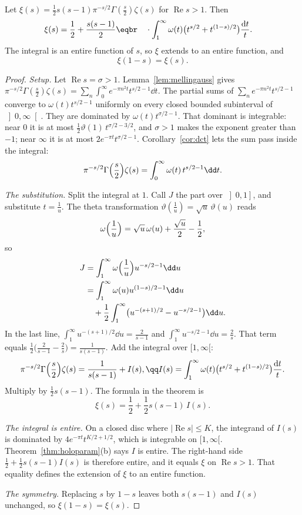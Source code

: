 \begin{theorem}[Riemann, 1859]\label{thm:functional}
Let $\xi(s)=\frac12s(s-1)\pi^{-s/2}\Gamma(\frac s2)\zeta(s)$ for $\operatorname{Re}s>1$. Then
\[
\begin{aligned}\xi(s)&=\frac12+\frac{s(s-1)}2\eqbr\quad\cdot\int_1^\infty\omega(t)\bigl(t^{s/2}+t^{(1-s)/2}\bigr)\frac{\mathrm dt}t.\end{aligned}
\]
The integral is an entire function of $s$, so $\xi$ extends to an entire function, and
\[
\xi(1-s)=\xi(s).
\]
\end{theorem}
\begin{proof}
\textit{Setup.} Let $\operatorname{Re}s=\sigma>1$. Lemma~\ref{lem:mellingauss} gives $\pi^{-s/2}\Gamma(\frac s2)\zeta(s)=\sum_n\int_0^\infty e^{-\pi n^2t}t^{s/2-1}\dd t$. The partial sums of $\sum_ne^{-\pi n^2t}t^{s/2-1}$ converge to $\omega(t)t^{s/2-1}$ uniformly on every closed bounded subinterval of $\left]0,\infty\right[$. They are dominated by $\omega(t)t^{\sigma/2-1}$. That dominant is integrable: near $0$ it is at most $\frac12\vartheta(1)\,t^{\sigma/2-3/2}$, and $\sigma>1$ makes the exponent greater than $-1$; near $\infty$ it is at most $2e^{-\pi t}t^{\sigma/2-1}$. Corollary~\ref{cor:dct} lets the sum pass inside the integral:
\[
\pi^{-s/2}\Gamma\Bigl(\frac s2\Bigr)\zeta(s)=\int_0^\infty\omega(t)\,t^{s/2-1}\dd t.
\]

\textit{The substitution.} Split the integral at $1$. Call $J$ the part over $\left]0,1\right]$, and substitute $t=\frac1u$. The theta transformation $\vartheta(\frac1u)=\sqrt u\,\vartheta(u)$ reads
\[
\omega\Bigl(\frac1u\Bigr)=\sqrt u\,\omega(u)+\frac{\sqrt u}2-\frac12,
\]
so
\[
\begin{aligned}J&=\int_1^\infty\omega\Bigl(\frac1u\Bigr)u^{-s/2-1}\dd u\\&=\int_1^\infty\omega(u)u^{(1-s)/2-1}\dd u\\&\quad+\frac12\int_1^\infty\bigl(u^{-(s+1)/2}-u^{-s/2-1}\bigr)\dd u.\end{aligned}
\]
In the last line, $\int_1^\infty u^{-(s+1)/2}\dd u=\frac2{s-1}$ and $\int_1^\infty u^{-s/2-1}\dd u=\frac2s$. That term equals $\frac12\bigl(\frac2{s-1}-\frac2s\bigr)=\frac1{s(s-1)}$. Add the integral over $[1,\infty[$:
\[
\begin{gathered}\pi^{-s/2}\Gamma\Bigl(\frac s2\Bigr)\zeta(s)=\frac1{s(s-1)}+I(s),\qq I(s)=\int_1^\infty\omega(t)\bigl(t^{s/2}+t^{(1-s)/2}\bigr)\frac{\mathrm dt}t.\end{gathered}
\]
Multiply by $\frac12 s(s-1)$. The formula in the theorem is
\[
\xi(s)=\frac12+\frac12 s(s-1)\,I(s).
\]

\textit{The integral is entire.} On a closed disc where $|\operatorname{Re}s|\le K$, the integrand of $I(s)$ is dominated by $4e^{-\pi t}t^{K/2+1/2}$, which is integrable on $[1,\infty[$. Theorem~\ref{thm:holoparam}(b) says $I$ is entire. The right-hand side $\frac12+\frac12 s(s-1)I(s)$ is therefore entire, and it equals $\xi$ on $\operatorname{Re}s>1$. That equality defines the extension of $\xi$ to an entire function.

\textit{The symmetry.} Replacing $s$ by $1-s$ leaves both $s(s-1)$ and $I(s)$ unchanged, so $\xi(1-s)=\xi(s)$.
\end{proof}

